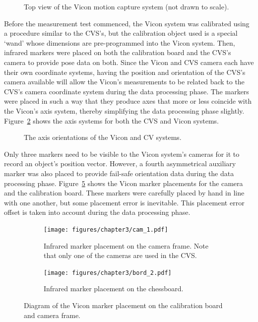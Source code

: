 \begin{figure}
  \centering
  \def\svgwidth{0.5\textwidth}
  
  \caption[Top view of the Vicon motion capture system.]{Top view of the Vicon motion capture system (not drawn to scale).}
\label{fig:chap3-vicon-layout}
\end{figure}

Before the measurement test commenced, the Vicon system was calibrated using a procedure similar to the CVS's, but the calibration object used is a special `wand' whose dimensions are pre-programmed into the Vicon system. Then, infrared markers were placed on both the calibration board and the CVS's camera to provide pose data on both. Since the Vicon and CVS camera each have their own coordinate systems, having the position and orientation of the CVS's camera available will allow the Vicon's measurements to be related back to the CVS's camera coordinate system during the data processing phase. The markers were placed in such a way that they produce axes that more or less coincide with the Vicon's axis system, thereby simplifying the data processing phase slightly. Figure~\ref{fig:chap3-cam-vicon-axes} shows the axis systems for both the CVS and Vicon systems.

\begin{figure}
  \centering
  \def\svgwidth{0.5\textwidth}
  
  \caption{The axis orientations of the Vicon and CV systems.}
\label{fig:chap3-cam-vicon-axes}
\end{figure}

Only three markers need to be visible to the Vicon system's cameras for it to record an object's position vector. However, a fourth asymmetrical auxiliary marker was also placed to provide fail-safe orientation data during the data processing phase. Figure~\ref{fig:chap3-vicon-marker-placement} shows the Vicon marker placements for the camera and the calibration board. These markers were carefully placed by hand in line with one another, but some placement error is inevitable. This placement error offset is taken into account during the data processing phase. 

\begin{figure}
  \centering 
  \begin{subfigure}[t]{0.48\textwidth}
    \centering
    \texttt{[image: figures/chapter3/cam\_1.pdf]}
    \caption[Infrared marker placement on the camera frame.]{Infrared marker placement on the camera frame. Note that only one of the cameras are used in the CVS.}
  \label{fig:chap3-cam-marker-placement}
  \end{subfigure}
  \begin{subfigure}[t]{0.48\textwidth}
    \centering
    \texttt{[image: figures/chapter3/bord\_2.pdf]}
    \caption{Infrared marker placement on the chessboard.}
  \label{fig:chap3-board-marker-placement}
  \end{subfigure}
\caption{Diagram of the Vicon marker placement on the calibration board and camera frame.}
\label{fig:chap3-vicon-marker-placement}
\end{figure}

